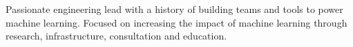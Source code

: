 \par{Passionate engineering lead with a history of building teams and tools to power machine learning.  Focused on increasing the impact of machine learning through research, infrastructure, consultation and education.
}